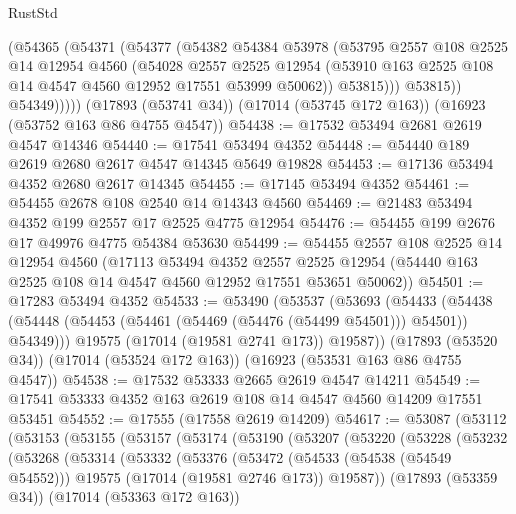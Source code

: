\begin{lexlean}{RustStd}
\begin{coremodule}
{\begin{coremodule}
{{{{{{{{{{{{{{{{{{{{{{{{{{{{{{{{{{{{{{{{{{{{{{{{{{{{{{{              (@54365
                (@54371
                  (@54377
                    (@54382
                      @54384
                      @53978
                      (@53795
                        @2557
                        @108
                        @2525
                        @14
                        @12954
                        @4560
                        (@54028
                          @2557
                          @2525
                          @12954
                          (@53910 @163 @2525 @108 @14 @4547 @4560 @12952 @17551 @53999 @50062))
                        @53815)))
                  @53815))
              @54349)))))
    (@17893 (@53741 @34))
    (@17014 (@53745 @172 @163))
    (@16923 (@53752 @163 @86 @4755 @4547))
@54438 := @17532 @53494 @2681 @2619 @4547 @14346
@54440 := @17541 @53494 @4352
@54448 := @54440 @189 @2619 @2680 @2617 @4547 @14345 @5649 @19828
@54453 := @17136 @53494 @4352 @2680 @2617 @14345
@54455 := @17145 @53494 @4352
@54461 := @54455 @2678 @108 @2540 @14 @14343 @4560
@54469 := @21483 @53494 @4352 @199 @2557 @17 @2525 @4775 @12954
@54476 := @54455 @199 @2676 @17 @49976 @4775 @54384 @53630
@54499 := @54455
    @2557
    @108
    @2525
    @14
    @12954
    @4560
    (@17113
      @53494
      @4352
      @2557
      @2525
      @12954
      (@54440 @163 @2525 @108 @14 @4547 @4560 @12952 @17551 @53651 @50062))
@54501 := @17283 @53494 @4352
@54533 := @53490
    (@53537
      (@53693
        (@54433 (@54438 (@54448 (@54453 (@54461 (@54469 (@54476 (@54499 @54501))) @54501)) @54349)))
        @19575
        (@17014 (@19581 @2741 @173))
        @19587))
    (@17893 (@53520 @34))
    (@17014 (@53524 @172 @163))
    (@16923 (@53531 @163 @86 @4755 @4547))
@54538 := @17532 @53333 @2665 @2619 @4547 @14211
@54549 := @17541 @53333 @4352 @163 @2619 @108 @14 @4547 @4560 @14209 @17551 @53451
@54552 := @17555 (@17558 @2619 @14209)
@54617 := @53087
    (@53112
      (@53153
        (@53155
          (@53157
            (@53174
              (@53190
                (@53207
                  (@53220
                    (@53228
                      (@53232
                        (@53268
                          (@53314
                            (@53332
                              (@53376
                                (@53472
                                  (@54533 (@54538 (@54549 @54552)))
                                  @19575
                                  (@17014 (@19581 @2746 @173))
                                  @19587))
                              (@17893 (@53359 @34))
                              (@17014 (@53363 @172 @163))
}}}}}}}}}}}}}}}}}}}}}}}}}}}}}}}}}}}}}}}}}}}}}}}}}}}}}}}
\end{coremodule}}
\end{coremodule}
\end{lexlean}
